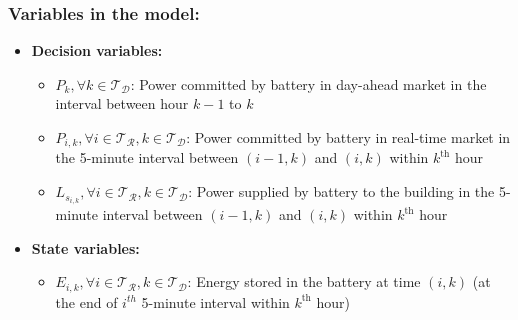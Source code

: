\documentclass[11pt,twoside]{article}
\begin{document}
\subsubsection{Variables in the model:}
\begin{itemize}
\item \textbf{Decision variables:}
\begin{itemize}
\item[\textbullet] $P_{k}, \forall k \in \mathcal{T_D}$: Power committed by battery in day-ahead market in the interval between hour $k-1$ to $k$
\item[\textbullet] $P_{i,k}, \forall i \in \mathcal{T_R}, k \in \mathcal{T_D}$: Power committed by battery in real-time market in the 5-minute interval between $(i-1,k)$ and $(i,k)$ within $k^\text{th}$ hour
\item[\textbullet] $L_{s_{i,k}}, \forall i \in \mathcal{T_R}, k \in \mathcal{T_D}$: Power supplied by battery to the building in the 5-minute interval between $(i-1,k)$ and $(i,k)$ within $k^\text{th}$ hour 
\end{itemize}
\item \textbf{State variables:}
\begin{itemize}
\item[\textbullet] $E_{i,k}, \forall i \in \mathcal{T_R}, k \in \mathcal{T_D}$: Energy stored in the battery at time $(i,k)$ (at the end of $i^{th}$ 5-minute interval within $k^\text{th}$ hour) 
\end{itemize}
\end{itemize}
\end{document}
